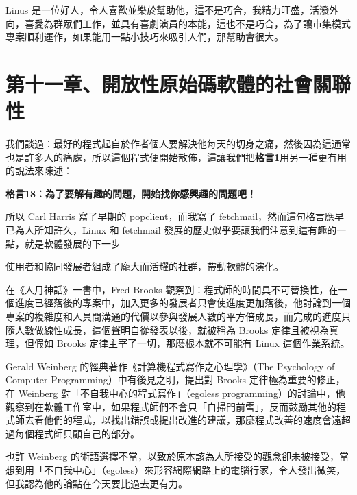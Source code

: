 \documentclass[10pt, b5paper]{book}
\makeatletter
\newcommand*{\shifttext}[2]{%
  \settowidth{\@tempdima}{#2}%
  \makebox[\@tempdima]{\hspace*{#1}#2}%
}
\makeatother
\begin{document}
Linus
是一位好人，令人喜歡並樂於幫助他，這不是巧合，我精力旺盛，活潑外向，喜愛為群眾們工作，並具有喜劇演員的本能，這也不是巧合，為了讓市集模式專案順利運作，如果能用一點小技巧來吸引人們，那幫助會很大。

\newpage
\section{第十一章、開放性原始碼軟體的社會關聯性}

我們談過︰最好的程式起自於作者個人要解決他每天的切身之痛，然後因為這通常也是許多人的痛處，所以這個程式便開始散佈，這讓我們把\textbf{格言1}用另一種更有用的說法來陳述︰

\textbf{格言18︰為了要解有趣的問題，開始找你感興趣的問題吧！}

所以 Carl Harris 寫了早期的 popclient，而我寫了
fetchmail，然而這句格言應早已為人所知許久，Linux 和 fetchmail
發展的歷史似乎要讓我們注意到這有趣的一點，就是軟體發展的下一步 \shifttext{1pt}{---}\shifttext{-1pt}{---}
使用者和協同發展者組成了龐大而活耀的社群，帶動軟體的演化。

在《人月神話》一書中，Fred Brooks
觀察到︰程式師的時間具不可替換性，在一個進度已經落後的專案中，加入更多的發展者只會使進度更加落後，他討論到一個專案的複雜度和人員間溝通的代價以參與發展人數的平方倍成長，而完成的進度只隨人數做線性成長，這個聲明自從發表以後，就被稱為
Brooks 定律且被視為真理，但假如 Brooks 定律主宰了一切，那麼根本就不可能有
Linux 這個作業系統。

Gerald Weinberg 的經典著作《計算機程式寫作之心理學》（The Psychology of
Computer Programming）中有後見之明，提出對 Brooks 定律極為重要的修正，在
Weinberg 對「不自我中心的程式寫作」（egoless
programming）的討論中，他觀察到在軟體工作室中，如果程式師們不會只「自掃門前雪」，反而鼓勵其他的程式師去看他們的程式，以找出錯誤或提出改進的建議，那麼程式改善的速度會遠超過每個程式師只顧自己的部分。

也許 Weinberg
的術語選擇不當，以致於原本該為人所接受的觀念卻未被接受，當想到用「不自我中心」（egoless）來形容網際網路上的電腦行家，令人發出微笑，但我認為他的論點在今天要比過去更有力。
\end{document}
